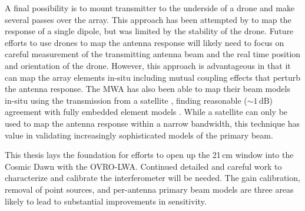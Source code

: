\begin{bibunit}
A final possibility is to mount transmitter to the underside of a drone and make several passes over
the array. This approach has been attempted by \citet{2017PASP..129c5002J} to map the response of a
single dipole, but was limited by the stability of the drone. Future efforts to use drones to map
the antenna response will likely need to focus on careful measurement of the transmitting antenna
beam and the real time position and orientation of the drone. However, this approach is advantageous
in that it can map the array elements in-situ including mutual coupling effects that perturb the
antenna response.  The MWA has also been able to map their beam models in-situ using the
transmission from a satellite \citep{2018arXiv180804516L}, finding reasonable ($\sim 1\,\text{dB}$)
agreement with fully embedded element models \citep{2017PASA...34...62S}. While a satellite can only
be used to map the antenna response within a narrow bandwidth, this technique has value in
validating increasingly sophisticated models of the primary beam.

This thesis lays the foundation for efforts to open up the 21\,cm window into the Cosmic Dawn with
the OVRO-LWA.  Continued detailed and careful work to characterize and calibrate the interferometer
will be needed. The gain calibration, removal of point sources, and per-antenna primary beam models
are three areas likely to lead to substantial improvements in sensitivity.

\end{bibunit}

